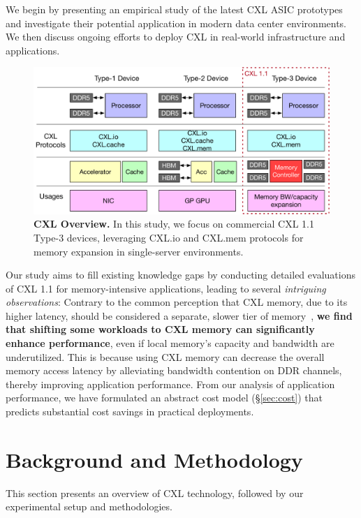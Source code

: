 We begin by presenting an empirical study of the latest CXL ASIC prototypes and investigate their potential application in modern data center environments. We then discuss ongoing efforts to deploy CXL in real-world infrastructure and applications.


\begin{figure}[t]
    \centering
      \includegraphics[width=0.8\columnwidth]{fig/cxl/cxl.pdf}
      \caption[CXL Overview]{\textbf{CXL Overview.} In this study, we focus on commercial CXL 1.1 Type-3 devices, leveraging CXL.io and CXL.mem protocols for memory expansion in single-server environments.} 
    \label{fig:cxl1.1} 
    \end{figure}


Our study aims to fill existing knowledge gaps by conducting detailed evaluations of CXL 1.1 for memory-intensive applications, leading to several \textit{intriguing observations}:
Contrary to the common perception that CXL memory, due to its higher latency, should be considered a separate, slower tier of memory~\cite{pond,tpp}, \textbf{we find that shifting some workloads to CXL memory can significantly enhance performance}, even if local memory's capacity and bandwidth are underutilized. This is because using CXL memory can decrease the overall memory access latency by alleviating bandwidth contention on DDR channels, thereby improving application performance.
From our analysis of application performance, we have formulated an abstract cost model (\S\ref{sec:cost}) that predicts substantial cost savings in practical deployments.

\section{Background and Methodology}
\label{sec:background}

This section presents an overview of CXL technology, followed by our experimental setup and methodologies.

